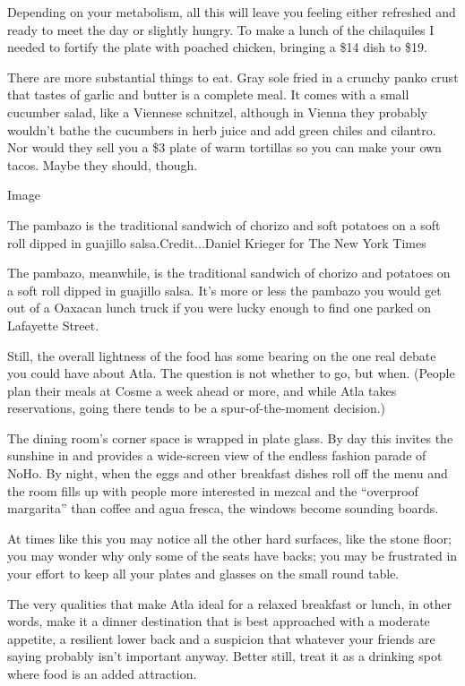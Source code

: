 Depending on your metabolism, all this will leave you feeling either
refreshed and ready to meet the day or slightly hungry. To make a lunch
of the chilaquiles I needed to fortify the plate with poached chicken,
bringing a \$14 dish to \$19.

There are more substantial things to eat. Gray sole fried in a crunchy
panko crust that tastes of garlic and butter is a complete meal. It
comes with a small cucumber salad, like a Viennese schnitzel, although
in Vienna they probably wouldn't bathe the cucumbers in herb juice and
add green chiles and cilantro. Nor would they sell you a \$3 plate of
warm tortillas so you can make your own tacos. Maybe they should,
though.

Image

The pambazo is the traditional sandwich of chorizo and soft potatoes on
a soft roll dipped in guajillo salsa.Credit...Daniel Krieger for The New
York Times

The pambazo, meanwhile, is the traditional sandwich of chorizo and
potatoes on a soft roll dipped in guajillo salsa. It's more or less the
pambazo you would get out of a Oaxacan lunch truck if you were lucky
enough to find one parked on Lafayette Street.

Still, the overall lightness of the food has some bearing on the one
real debate you could have about Atla. The question is not whether to
go, but when. (People plan their meals at Cosme a week ahead or more,
and while Atla takes reservations, going there tends to be a
spur-of-the-moment decision.)

The dining room's corner space is wrapped in plate glass. By day this
invites the sunshine in and provides a wide-screen view of the endless
fashion parade of NoHo. By night, when the eggs and other breakfast
dishes roll off the menu and the room fills up with people more
interested in mezcal and the ``overproof margarita'' than coffee and
agua fresca, the windows become sounding boards.

At times like this you may notice all the other hard surfaces, like the
stone floor; you may wonder why only some of the seats have backs; you
may be frustrated in your effort to keep all your plates and glasses on
the small round table.

The very qualities that make Atla ideal for a relaxed breakfast or
lunch, in other words, make it a dinner destination that is best
approached with a moderate appetite, a resilient lower back and a
suspicion that whatever your friends are saying probably isn't important
anyway. Better still, treat it as a drinking spot where food is an added
attraction.

